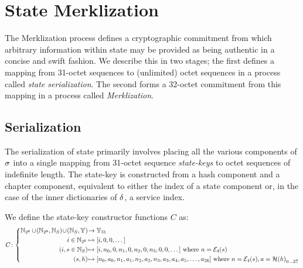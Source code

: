 \section{State Merklization}\label{sec:statemerklization}

The Merklization process defines a cryptographic commitment from which arbitrary information within state may be provided as being authentic in a concise and swift fashion. We describe this in two stages; the first defines a mapping from 31-octet sequences to (unlimited) octet sequences in a process called \emph{state serialization}. The second forms a 32-octet commitment from this mapping in a process called \emph{Merklization}.

\subsection{Serialization}

The serialization of state primarily involves placing all the various components of $\sigma$ into a single mapping from 31-octet sequence \emph{state-keys} to octet sequences of indefinite length. The state-key is constructed from a hash component and a chapter component, equivalent to either the index of a state component or, in the case of the inner dictionaries of $\delta$, a service index.

We define the state-key constructor functions $C$ as:
\begin{equation}
  C\colon\abracegroup{
    \Nbits{8} \cup \tup{\Nbits{8}, \serviceid} \cup \tup{\serviceid, \blob} &\to \blob[31] \\
    i \in \Nbits{8} &\mapsto \sq{i, 0, 0, \dots} \\
    \tup{i, s \in \serviceid} &\mapsto \sq{i, n_0, 0, n_1, 0, n_2, 0, n_3, 0, 0, \dots}\ \where n = \encode[4]{s} \\
    \tup{s, h} &\mapsto \sq{n_0, a_0, n_1, a_1, n_2, a_2, n_3, a_3, a_4, a_5, \dots, a_{26}}\ \where n = \encode[4]{s}, a = \blake{h}\interval{0}{27}
  }
\end{equation}

